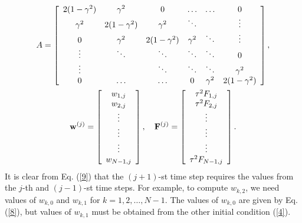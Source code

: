 \begin{gather}
A=\left[
\begin{array}{cccccc}
2(1-\gamma^{2}) &\gamma^{2} &0      &\dots  &\dots &0 \\
\gamma^{2} &2(1-\gamma^{2}) &\gamma^{2} &\ddots  &     &\vdots \\
0      &\gamma^{2} &2(1-\gamma^{2}) &\gamma^{2} &\ddots &\vdots \\
\vdots &\ddots &\ddots &\ddots &\ddots &0 \\
\vdots &       &\ddots &\ddots &\ddots &\gamma^{2} \\
0      &\dots  &\dots  &0      &\gamma^{2} &2(1-\gamma^{2})
\end{array}\right], \\
{\bf w}^{(j)}=\left[
\begin{array}{c}
w_{1,j} \\
w_{2,j} \\
\vdots \\
\vdots \\
\vdots \\
w_{N-1,j}
\end{array}\right], \quad
{\bf F}^{(j)}=\left[
\begin{array}{c}
\tau^2 F_{1,j} \\
\tau^2 F_{2,j} \\
\vdots \\
\vdots \\
\vdots \\
\tau^2 F_{N-1,j}
\end{array}\right].
\label{77}
\end{gather}
It is clear from Eq. (\ref{9}) that the $(j+1)$-st time step
requires the values from the $j$-th and $(j-1)$-st time steps. For
example, to compute $w_{k,2}$, we need values of $w_{k,0}$ and
$w_{k,1}$ for $k=1, 2, \dots, N-1$. The values of $w_{k,0}$ are
given by Eq. (\ref{8}), but values of $w_{k,1}$ must be obtained
from the other initial condition (\ref{4}).

